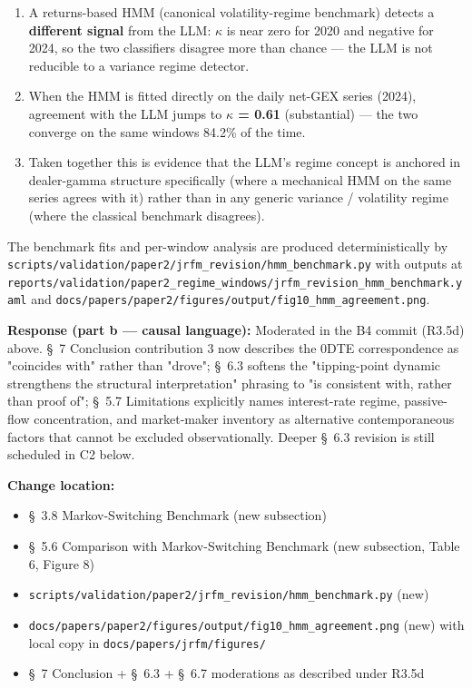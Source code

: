 \documentclass[11pt,a4paper]{article}
\begin{document}
\begin{enumerate}
\item A returns-based HMM (canonical volatility-regime benchmark) detects a \textbf{different signal} from the LLM: $\kappa$ is near zero for 2020 and negative for 2024, so the two classifiers disagree more than chance --- the LLM is not reducible to a variance regime detector.
\item When the HMM is fitted directly on the daily net-GEX series (2024), agreement with the LLM jumps to \textbf{$\kappa$ = 0.61} (substantial) --- the two converge on the same windows 84.2\% of the time.
\item Taken together this is evidence that the LLM's regime concept is anchored in dealer-gamma structure specifically (where a mechanical HMM on the same series agrees with it) rather than in any generic variance / volatility regime (where the classical benchmark disagrees).
\end{enumerate}

The benchmark fits and per-window analysis are produced deterministically
by \texttt{scripts/validation/paper2/jrfm\_revision/hmm\_benchmark.py} with
outputs at
\texttt{reports/validation/paper2\_regime\_windows/jrfm\_revision\_hmm\_benchmark.yaml}
and \texttt{docs/papers/paper2/figures/output/fig10\_hmm\_agreement.png}.

\textbf{Response (part b --- causal language):} Moderated in the B4 commit
(R3.5d) above. \S{}~7 Conclusion contribution 3 now describes the 0DTE
correspondence as "coincides with" rather than "drove"; \S{}~6.3 softens
the "tipping-point dynamic strengthens the structural interpretation"
phrasing to "is consistent with, rather than proof of"; \S{}~5.7
Limitations explicitly names interest-rate regime, passive-flow
concentration, and market-maker inventory as alternative
contemporaneous factors that cannot be excluded observationally.
Deeper \S{}~6.3 revision is still scheduled in C2 below.

\textbf{Change location:}

\begin{itemize}
\item \S{}~3.8 Markov-Switching Benchmark (new subsection)
\item \S{}~5.6 Comparison with Markov-Switching Benchmark (new subsection, Table 6, Figure 8)
\item \texttt{scripts/validation/paper2/jrfm\_revision/hmm\_benchmark.py} (new)
\item \texttt{docs/papers/paper2/figures/output/fig10\_hmm\_agreement.png} (new) with local copy in \texttt{docs/papers/jrfm/figures/}
\item \S{}~7 Conclusion + \S{}~6.3 + \S{}~6.7 moderations as described under R3.5d
\end{itemize}
\end{document}
